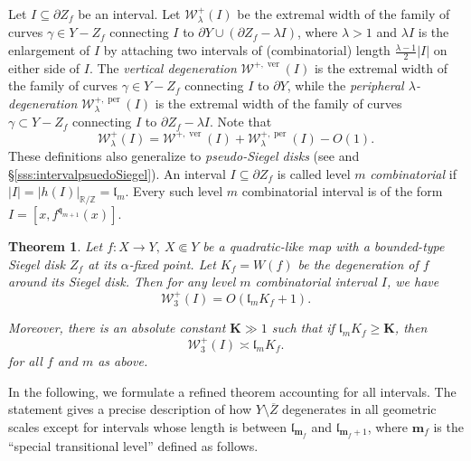 \documentclass{amsart}
\newcommand{\1}{{\mathbb 1 }}
\newcommand{\bK}{{\mathbf K}}
\newcommand{\bbm}{{\mathbf m}}
\newcommand{\qq}{\mathfrak{q}}
\newcommand{\length}{{\mathfrak l}}
\newcommand\ver{{\operatorname{ver}}}
\newcommand\per{{\operatorname{per}}}
\newcommand{\R}{\mathbb{R}}
\newcommand{\Z}{\mathbb{Z}}
\newtheorem{thm}{Theorem}[section]
\theoremstyle{remark}
\numberwithin{equation}{section}
\theoremstyle{definition}
\begin{document}
Let $I \subseteq \partial Z_f$ be an interval.
Let $\mathcal{W}_{\lambda}^+(I)$ be the extremal width of the family of curves $\gamma \in Y - Z_f$ connecting $I$ to $\partial Y \cup (\partial Z_f - \lambda I)$, where $\lambda > 1$ and $\lambda I$ is the enlargement of $I$ by attaching two intervals of (combinatorial) length $\frac{\lambda-1}{2} |I|$ on either side of $I$.
The {\em vertical degeneration} $\mathcal{W}^{+, \ver}(I)$ is the extremal width of the family of curves $\gamma \in Y - Z_f$ connecting $I$ to $\partial Y$, while the {\em peripheral $\lambda$-degeneration} $\mathcal{W}_{\lambda}^{+, \per}(I)$ is the extremal width of the family of curves $\gamma \subset Y - Z_f$ connecting $I$ to $\partial Z_f - \lambda I$.
Note that
$$
\mathcal{W}_{\lambda}^+(I) = \mathcal{W}^{+, \ver}(I) + \mathcal{W}_{\lambda}^{+, \per}(I)-O(1).
$$
These definitions also generalize to {\em pseudo-Siegel disks} (see \cite[\S 5]{DL22} and \S\ref{sss:intervalpsuedoSiegel}).
An interval $I \subseteq \partial Z_f$ is called level $m$ {\em combinatorial} if $|I| = |h(I)|_{\R/\Z} = \length_m$. Every such level $m$ combinatorial interval is of the form $I=[x, f^{\qq_{m+1}}(x)]$.



\begin{thm}\label{thm:combinatorial main}
    Let $f: X \longrightarrow Y, \ X\Subset Y$ be a quadratic-like map with a bounded-type Siegel disk $Z_f$ at its $\alpha$-fixed point.
    Let $K_f = W(f)$ be the degeneration of $f$ around its Siegel disk. Then for any level $m$ combinatorial interval $I$, we have
    $$
    \mathcal{W}_3^+(I) = O(\length_mK_f+1).
    $$

    Moreover, there is an absolute constant $\bK\gg 1$ such that if $\length_m K_f \ge \bK$, then 
    $$
    \mathcal{W}_3^+(I) \asymp  \length_m K_f.
    $$
    for all $f$ and $m$ as above.
\end{thm}


In the following, we formulate a refined theorem accounting for all intervals. The statement gives a precise description of how $Y\setminus \overline Z$ degenerates in all geometric scales except for intervals whose length is between $\length_{\bbm_f}$ and $\length_{\bbm_f+1}$, where $\bbm_f$ is the ``special transitional level'' defined as follows.
\end{document}
